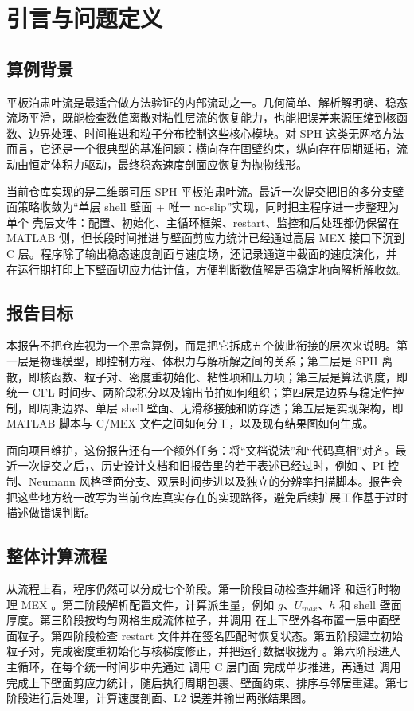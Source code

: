 \chapter{引言与问题定义}

\section{算例背景}
平板泊肃叶流是最适合做方法验证的内部流动之一。几何简单、解析解明确、稳态流场平滑，既能检查数值离散对粘性层流的恢复能力，也能把误差来源压缩到核函数、边界处理、时间推进和粒子分布控制这些核心模块。对 SPH 这类无网格方法而言，它还是一个很典型的基准问题：横向存在固壁约束，纵向存在周期延拓，流动由恒定体积力驱动，最终稳态速度剖面应恢复为抛物线形。

当前仓库实现的是二维弱可压 SPH 平板泊肃叶流。最近一次提交把旧的多分支壁面策略收敛为“单层 shell 壁面 + 唯一 no-slip”实现，同时把主程序进一步整理为单个  壳层文件：配置、初始化、主循环框架、restart、监控和后处理都仍保留在 MATLAB 侧，但长段时间推进与壁面剪应力统计已经通过高层 MEX 接口下沉到 C 层。程序除了输出稳态速度剖面与速度场，还记录通道中截面的速度演化，并在运行期打印上下壁面切应力估计值，方便判断数值解是否稳定地向解析解收敛。

\section{报告目标}
本报告不把仓库视为一个黑盒算例，而是把它拆成五个彼此衔接的层次来说明。第一层是物理模型，即控制方程、体积力与解析解之间的关系；第二层是 SPH 离散，即核函数、粒子对、密度重初始化、粘性项和压力项；第三层是算法调度，即统一 CFL 时间步、两阶段积分以及输出节拍如何组织；第四层是边界与稳定性控制，即周期边界、单层 shell 壁面、无滑移接触和防穿透；第五层是实现架构，即 MATLAB 脚本与 C/MEX 文件之间如何分工，以及现有结果图如何生成。

面向项目维护，这份报告还有一个额外任务：将“文档说法”和“代码真相”对齐。最近一次提交之后，、历史设计文档和旧报告里的若干表述已经过时，例如 、PI 控制、Neumann 风格壁面分支、双层时间步进以及独立的分辨率扫描脚本。报告会把这些地方统一改写为当前仓库真实存在的实现路径，避免后续扩展工作基于过时描述做错误判断。

\section{整体计算流程}
从流程上看，程序仍然可以分成七个阶段。第一阶段自动检查并编译  和运行时物理 MEX 。第二阶段解析配置文件，计算派生量，例如 $g$、$U_{max}$、$h$ 和 shell 壁面厚度。第三阶段按均匀网格生成流体粒子，并调用  在上下壁外各布置一层中面壁面粒子。第四阶段检查 restart 文件并在签名匹配时恢复状态。第五阶段建立初始粒子对，完成密度重初始化与核梯度修正，并把运行数据收拢为 。第六阶段进入主循环，在每个统一时间步中先通过  调用 C 层门面  完成单步推进，再通过  调用  完成上下壁面剪应力统计，随后执行周期包裹、壁面约束、排序与邻居重建。第七阶段进行后处理，计算速度剖面、L2 误差并输出两张结果图。

